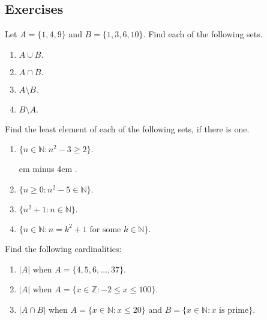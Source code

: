 \documentclass[11pt,]{book}
\newcommand{\fillin}[1]{\leavevmode\leaders\vrule height -1.2pt depth 1.5pt \hskip #1em minus #1em \null}
\theoremstyle{ptxplainnotitle}
\theoremstyle{ptxplaintitle}
\theoremstyle{ptxdefinitionnotitle}
\theoremstyle{ptxdefinitiontitle}
\theoremstyle{ptxdefinitionnotitle}
\theoremstyle{ptxdefinitiontitle}
\theoremstyle{ptxdefinitionnotitle}
\theoremstyle{ptxdefinitiontitle}
\theoremstyle{ptxdefinitiontitlenonumber}
\theoremstyle{ptxdefinitiontitlenonumber}
\numberwithin{equation}{chapter}
\newcommand{\N}{\mathbb N}
\newcommand{\Z}{\mathbb Z}
\newcommand{\st}{:}
\begin{document}
\subsection*{Exercises}\hypertarget{exercises_intro-sets}{}
\begin{divisionexercise}{1}\hypertarget{exercise-79}{}
\hypertarget{p-781}{}%
Let \(A = \{1, 4, 9\}\) and \(B = \{1, 3, 6, 10\}\text{.}\)  Find each of the following sets. \leavevmode%
\begin{enumerate}[label=(\alph*)]
\item\hypertarget{li-341}{}\hypertarget{p-782}{}%
\(A \cup B\text{.}\)%
\item\hypertarget{li-342}{}\hypertarget{p-784}{}%
\(A \cap B\text{.}\)%
\item\hypertarget{li-343}{}\hypertarget{p-786}{}%
\(A \setminus B\text{.}\)%
\item\hypertarget{li-344}{}\hypertarget{p-788}{}%
\(B \setminus A\text{.}\)%
\end{enumerate}
%
\end{divisionexercise}%
\begin{divisionexercise}{2}\hypertarget{exercise-80}{}
\hypertarget{p-810}{}%
Find the least element of each of the following sets, if there is one. \leavevmode%
\begin{enumerate}[label=(\alph*)]
\item\hypertarget{li-357}{}\hypertarget{p-811}{}%
\(\{n \in \N \st n^2 - 3 \ge 2\}\text{.}\)%
\par
\hypertarget{p-812}{}%
 \fillin{4}.%
\item\hypertarget{li-358}{}\hypertarget{p-813}{}%
\(\{n \ge 0 \st n^2 - 5 \in \N\}\text{.}\)%
\item\hypertarget{li-359}{}\hypertarget{p-815}{}%
\(\{n^2+1 \st n \in \N\}\text{.}\)%
\item\hypertarget{li-360}{}\hypertarget{p-817}{}%
\(\{n \in \N \st n = k^2 + 1 \text{ for some } k \in \N\}\text{.}\)%
\end{enumerate}
%
\end{divisionexercise}%
\begin{divisionexercise}{3}\hypertarget{exercise-81}{}
\hypertarget{p-836}{}%
Find the following cardinalities: \leavevmode%
\begin{enumerate}[label=(\alph*)]
\item\hypertarget{li-371}{}\hypertarget{p-837}{}%
\(|A|\) when \(A = \{4,5,6,\ldots,37\}\text{.}\)%
\item\hypertarget{li-372}{}\hypertarget{p-839}{}%
\(|A|\) when \(A = \{x \in \Z \st -2 \le x \le 100\}\text{.}\)%
\item\hypertarget{li-373}{}\hypertarget{p-841}{}%
\(|A \cap B|\) when \(A = \{x \in \N \st x \le 20\}\) and \(B = \{x \in \N \st x \mbox{ is prime} \}\text{.}\)%
\end{enumerate}
%
\end{divisionexercise}%
\end{document}
